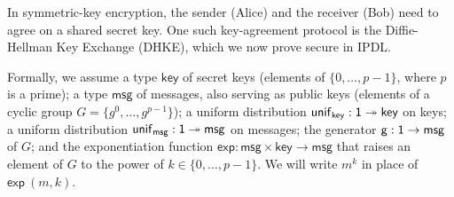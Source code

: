 \renewcommand{\key}{\mathsf{key}}
\renewcommand{\msg}{\mathsf{msg}}
\renewcommand{\unif}{\mathsf{unif}}
\renewcommand{\gen}{\mathsf{g}}
\renewcommand{\exp}{\mathsf{exp}}
\renewcommand{\id}{\mathsf{id}}
\renewcommand{\net}{\mathsf{net}}
\renewcommand{\adv}{\mathsf{adv}}
\newcommand{\Alice}{\mathsf{Alice}}
\newcommand{\Bob}{\mathsf{Bob}}
\renewcommand{\Key}{\mathsf{Key}}
\renewcommand{\Send}{\mathsf{Send}}
\renewcommand{\Recv}{\mathsf{Recv}}
\newcommand{\OkKey}{\mathsf{OkKey}}
\newcommand{\SharedKey}{\mathsf{SharedKey}}
\newcommand{\SecretKey}{\mathsf{SecretKey}}
\newcommand{\PublicKey}{\mathsf{PublicKey}}
\newcommand{\LeakPublicKey}{\mathsf{LeakPublicKey}}
\newcommand{\OkPublicKey}{\mathsf{OkPublicKey}}
\newcommand{\DDH}{\mathsf{DDH}}

In symmetric-key encryption, the sender (Alice) and the receiver (Bob) need to agree on a shared secret key. One such key-agreement protocol is the Diffie-Hellman Key Exchange (DHKE), which we now prove secure in \textsf{IPDL}.

Formally, we assume a type $\key$ of secret keys (elements of $\{0,\ldots,p-1\}$, where $p$ is a prime); a type $\msg$ of messages, also serving as public keys (elements of a cyclic group $G = \{g^0,\ldots,g^{p-1}\}$); a uniform distribution $\unif_\key : \one \twoheadrightarrow \key$ on keys; a uniform distribution $\unif_\msg : \one \twoheadrightarrow \msg$ on messages; the generator $\gen : \one \rightarrow \msg$ of $G$; and the exponentiation function $\exp : \msg \times \key \rightarrow \msg$ that raises an element of $G$ to the power of $k \in \{0,\ldots,p-1\}$. We will write $m^k$ in place of $\exp \ (m,k)$.

